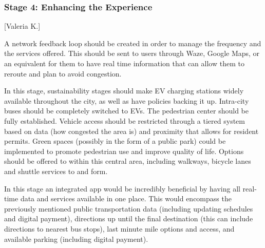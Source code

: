 \documentclass[12pt]{article}                               %
\begin{document}
\subsubsection{Stage 4: Enhancing the Experience}[Valeria K.]

A network feedback loop should be created in order to manage the frequency and the services offered. This should be sent to users through Waze, Google Maps, or an equivalent for them to have real time information that can allow them to reroute and plan to avoid congestion.

In this stage, sustainability stages should make EV charging stations widely available throughout the city, as well as have policies backing it up. Intra-city buses should be completely switched to EVs. The pedestrian center should be fully established. Vehicle access should be restricted through a tiered system based on data (how congested the area is) and proximity that allows for resident permits. Green spaces (possibly in the form of a public park) could be implemented to promote pedestrian use and improve quality of life. Options should be offered to within this central area, including walkways, bicycle lanes and shuttle services to and form. 

In this stage an integrated app would be incredibly beneficial by having all real-time data and services available in one place. This would encompass the previously mentioned public transportation data (including updating schedules and digital payment), directions up until the final destination (this can include directions to nearest bus stops), last minute mile options and access, and available parking (including digital payment).


\end{document}
